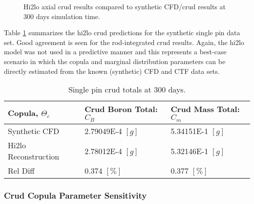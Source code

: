 \begin{figure}[H]%
    \centering
    \qquad
    \caption{Hi2lo axial crud results compared to synthetic CFD/crud results at 300 days simulation time. }%
    \label{fig:hi2lopincmass}%
\end{figure}


Table \ref{tab:crud_totals_2} summarizes the hi2lo crud predictions for the synthetic single pin data set.  Good agreement is seen for the rod-integrated crud results.  Again, the hi2lo model was not used in a predictive manner and this represents a best-case scenario in which the copula and marginal distribution parameters can be directly estimated from the known (synthetic) CFD and CTF data sets.

\begin{table}[h]
    \begin{center}
        \caption[Crud totals for synthetic and hi2lo models.]{Single pin crud totals at 300 days.}
        \begin{tabular}[h]{|l | l | l |}
            \hline
            Copula, $\Theta_c$ & Crud Boron Total: $C_B$ & Crud Mass Total: $C_m$ \\
            \hline  \hline
            Synthetic CFD &  2.79049E-4 $[g]$ & 5.34151E-1 $[g]$ \\
            Hi2lo Reconstruction &  2.78012E-4  $[g]$ & 5.32146E-1 $[g]$ \\
            \hline
            Rel Diff &  0.374 $[\%]$ & 0.377 $[\%]$ \\
            \hline
        \end{tabular}
        \label{tab:crud_totals_2}
    \end{center}
\end{table}



\subsubsection{Crud Copula Parameter Sensitivity}
\label{sec:crud_copula_sensi}

